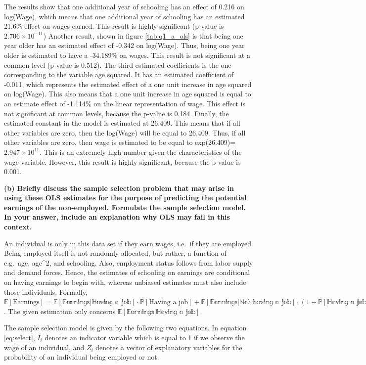 \documentclass[
]{article}
\begin{document}
The results show that one additional year of schooling has an effect of
0.216 on log(Wage), which means that one additional year of schooling
has an estimated 21.6\% effect on wages earned. This result is highly
significant (p-value is \ensuremath{2.706\times 10^{-11}}) Another
result, shown in figure \ref{tab:q1_a_ols} is that being one year older
has an estimated effect of -0.342 on log(Wage). Thus, being one year
older is estimated to have a -34.189\% on wages. This result is not
significant at a common level (p-value is 0.512). The third estimated
coefficients is the one corresponding to the variable age squared. It
has an estimated coefficient of -0.011, which represents the estimated
effect of a one unit increase in age squared on log(Wage). This also
means that a one unit increase in age squared is equal to an estimate
effect of -1.114\% on the linear representation of wage. This effect is
not significant at common levels, because the p-value is 0.184. Finally,
the estimated constant in the model is estimated at 26.409. This means
that if all other variables are zero, then the log(Wage) will be equal
to 26.409. Thus, if all other variables are zero, then wage is estimated
to be equal to exp(26.409)=\ensuremath{2.947\times 10^{11}}. This is an
extremely high number given the characteristics of the wage variable.
However, this result is highly significant, because the p-value is
0.001.

\textbf{(b) Briefly discuss the sample selection problem that may arise
in using these OLS estimates for the purpose of predicting the potential
earnings of the non-employed. Formulate the sample selection model. In
your answer, include an explanation why OLS may fail in this context.}

An individual is only in this data set if they earn wages, i.e.~if they
are employed. Being employed itself is not randomly allocated, but
rather, a function of e.g.~age, age\^{}2, and schooling. Also,
employment status follows from labor supply and demand forces. Hence,
the estimates of schooling on earnings are conditional on having
earnings to begin with, whereas unbiased estimates must also include
those individuals. Formally,
\(\mathbb{E}[\text{Earnings}] = \mathbb{E[\text{Earnings}|\text{Having a job}]} \cdot \mathbb{P}[\text{Having a job}] + \mathbb{E[\text{Earnings}|\text{Not having a job}]} \cdot (1-\mathbb{P[\text{Having a job}]})\).
The given estimation only concerns
\(\mathbb{E[\text{Earnings}|\text{Having a job}]}\).

The sample selection model is given by the following two equations. In
equation \ref{eq:select}, \(I_i\) denotes an indicator variable which is
equal to 1 if we observe the wage of an individual, and \(Z_i\) denotes
a vector of explanatory variables for the probability of an individual
being employed or not.
\end{document}
